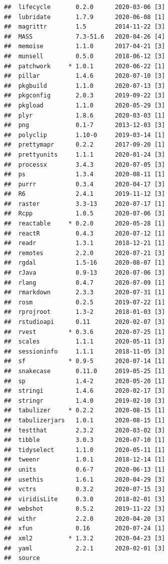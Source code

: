 \documentclass[
  french,
]{book}
\begin{document}
\begin{verbatim}
##  lifecycle       0.2.0      2020-03-06 [3]
##  lubridate       1.7.9      2020-06-08 [1]
##  magrittr        1.5        2014-11-22 [3]
##  MASS            7.3-51.6   2020-04-26 [4]
##  memoise         1.1.0      2017-04-21 [3]
##  munsell         0.5.0      2018-06-12 [3]
##  patchwork     * 1.0.1      2020-06-22 [1]
##  pillar          1.4.6      2020-07-10 [3]
##  pkgbuild        1.1.0      2020-07-13 [3]
##  pkgconfig       2.0.3      2019-09-22 [3]
##  pkgload         1.1.0      2020-05-29 [3]
##  plyr            1.8.6      2020-03-03 [1]
##  png             0.1-7      2013-12-03 [3]
##  polyclip        1.10-0     2019-03-14 [1]
##  prettymapr      0.2.2      2017-09-20 [1]
##  prettyunits     1.1.1      2020-01-24 [3]
##  processx        3.4.3      2020-07-05 [3]
##  ps              1.3.4      2020-08-11 [1]
##  purrr           0.3.4      2020-04-17 [3]
##  R6              2.4.1      2019-11-12 [3]
##  raster          3.3-13     2020-07-17 [1]
##  Rcpp            1.0.5      2020-07-06 [3]
##  reactable     * 0.2.0      2020-05-28 [1]
##  reactR          0.4.3      2020-07-12 [1]
##  readr           1.3.1      2018-12-21 [1]
##  remotes         2.2.0      2020-07-21 [3]
##  rgdal           1.5-16     2020-08-07 [1]
##  rJava           0.9-13     2020-07-06 [3]
##  rlang           0.4.7      2020-07-09 [1]
##  rmarkdown       2.3.3      2020-07-31 [1]
##  rosm            0.2.5      2019-07-22 [1]
##  rprojroot       1.3-2      2018-01-03 [3]
##  rstudioapi      0.11       2020-02-07 [3]
##  rvest         * 0.3.6      2020-07-25 [1]
##  scales          1.1.1      2020-05-11 [3]
##  sessioninfo     1.1.1      2018-11-05 [3]
##  sf            * 0.9-5      2020-07-14 [1]
##  snakecase       0.11.0     2019-05-25 [1]
##  sp              1.4-2      2020-05-20 [1]
##  stringi         1.4.6      2020-02-17 [3]
##  stringr         1.4.0      2019-02-10 [3]
##  tabulizer     * 0.2.2      2020-08-15 [1]
##  tabulizerjars   1.0.1      2020-08-15 [1]
##  testthat        2.3.2      2020-03-02 [3]
##  tibble          3.0.3      2020-07-10 [1]
##  tidyselect      1.1.0      2020-05-11 [1]
##  tweenr          1.0.1      2018-12-14 [1]
##  units           0.6-7      2020-06-13 [1]
##  usethis         1.6.1      2020-04-29 [3]
##  vctrs           0.3.2      2020-07-15 [3]
##  viridisLite     0.3.0      2018-02-01 [3]
##  webshot         0.5.2      2019-11-22 [3]
##  withr           2.2.0      2020-04-20 [3]
##  xfun            0.16       2020-07-24 [1]
##  xml2          * 1.3.2      2020-04-23 [3]
##  yaml            2.2.1      2020-02-01 [3]
##  source                                 

\end{verbatim}
\end{document}
